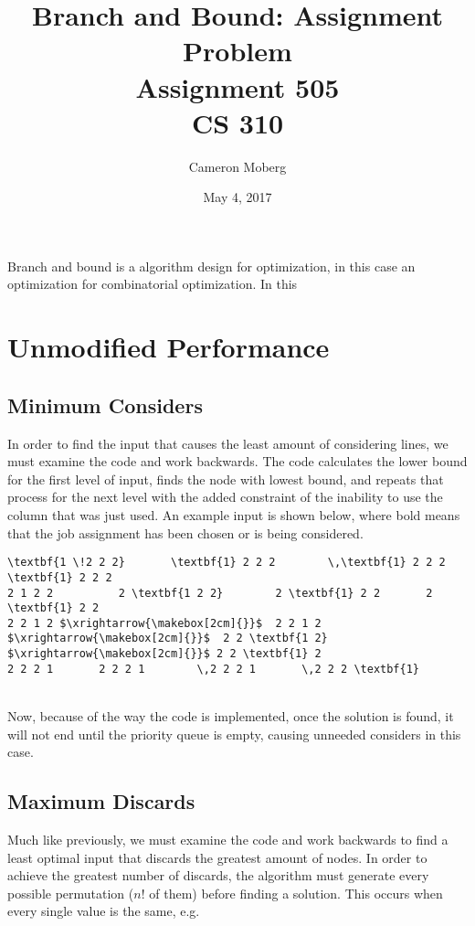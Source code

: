 \documentclass[11pt]{article}
\begin{document}
\thispagestyle{empty}
\title{Branch and Bound: Assignment Problem \\
\large Assignment 505 \\
CS 310}
\date{May 4, 2017}
\author{Cameron Moberg}
\maketitle
 
Branch and bound is a algorithm design for optimization, in this case an optimization for combinatorial optimization. In this 

\section{Unmodified Performance}
\subsection{Minimum Considers}
In order to find the input that causes the least amount of considering lines, we must examine the code and work backwards. The code calculates the lower bound for the first level of input, finds the node with lowest bound, and repeats that process for the next level with the added constraint of the inability to use the column that was just used. An example input is shown below, where bold means that the job assignment has been chosen or is being considered.
\begin{Verbatim}[commandchars=\\\{\},codes={\catcode`\$=3\catcode`_=8}]
\textbf{1 \!2 2 2} 	     \textbf{1} 2 2 2 	     \,\textbf{1} 2 2 2	     \textbf{1} 2 2 2
2 1 2 2 	     2 \textbf{1 2 2} 	     2 \textbf{1} 2 2 	    2 \textbf{1} 2 2
2 2 1 2 $\xrightarrow{\makebox[2cm]{}}$  2 2 1 2 $\xrightarrow{\makebox[2cm]{}}$  2 2 \textbf{1 2} $\xrightarrow{\makebox[2cm]{}}$ 2 2 \textbf{1} 2
2 2 2 1	      2 2 2 1 	     \,2 2 2 1	     \,2 2 2 \textbf{1}
\end{Verbatim}
 \\
Now, because of the way the code is implemented, once the solution is found, it will not end until the priority queue is empty, causing unneeded considers in this case.
\subsection{Maximum Discards}
Much like previously, we must examine the code and work backwards to find a least optimal input that discards the greatest amount of nodes. In order to achieve the greatest number of discards, the algorithm must generate every possible permutation ($n!$ of them) before finding a solution. This occurs when every single value is the same, e.g. \\
\end{document}
